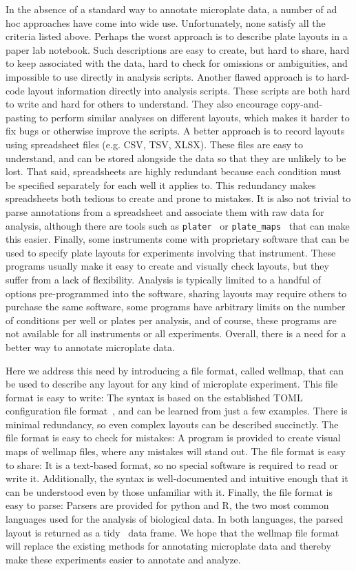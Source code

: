 \documentclass{bmcart}
\begin{document}
In the absence of a standard way to annotate microplate data, a number of ad hoc approaches have come into wide use. Unfortunately, none satisfy all the criteria listed above.  Perhaps the worst approach is to describe plate layouts in a paper lab notebook. Such descriptions are easy to create, but hard to share, hard to keep associated with the data, hard to check for omissions or ambiguities, and impossible to use directly in analysis scripts.  Another flawed approach is to hard-code layout information directly into analysis scripts. These scripts are both hard to write and hard for others to understand. They also encourage copy-and-pasting to perform similar analyses on different layouts, which makes it harder to fix bugs or otherwise improve the scripts. A better approach is to record layouts using spreadsheet files (e.g. CSV, TSV, XLSX). These files are easy to understand, and can be stored alongside the data so that they are unlikely to be lost. That said, spreadsheets are highly redundant because each condition must be specified separately for each well it applies to. This redundancy makes spreadsheets both tedious to create and prone to mistakes. It is also not trivial to parse annotations from a spreadsheet and associate them with raw data for analysis, although there are tools such as \texttt{plater}~\cite{hughes2020} or \texttt{plate\_maps}~\cite{jones2014} that can make this easier. Finally, some instruments come with proprietary software that can be used to specify plate layouts for experiments involving that instrument. These programs usually make it easy to create and visually check layouts, but they suffer from a lack of flexibility. Analysis is typically limited to a handful of options pre-programmed into the software, sharing layouts may require others to purchase the same software, some programs have arbitrary limits on the number of conditions per well or plates per analysis, and of course, these programs are not available for all instruments or all experiments. Overall, there is a need for a better way to annotate microplate data.

Here we address this need by introducing a file format, called wellmap, that can be used to describe any layout for any kind of microplate experiment. This file format is easy to write: The syntax is based on the established TOML configuration file format~\cite{preston-werner2020}, and can be learned from just a few examples. There is minimal redundancy, so even complex layouts can be described succinctly. The file format is easy to check for mistakes: A program is provided to create visual maps of wellmap files, where any mistakes will stand out. The file format is easy to share: It is a text-based format, so no special software is required to read or write it. Additionally, the syntax is well-documented and intuitive enough that it can be understood even by those unfamiliar with it. Finally, the file format is easy to parse: Parsers are provided for python and R, the two most common languages used for the analysis of biological data. In both languages, the parsed layout is returned as a tidy~\cite{wickham2014} data frame. We hope that the wellmap file format will replace the existing methods for annotating microplate data and thereby make these experiments easier to annotate and analyze.
\end{document}
